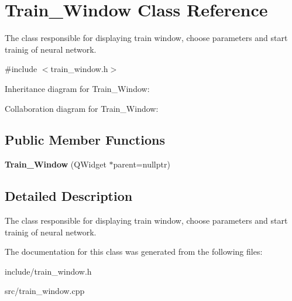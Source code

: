 \hypertarget{classTrain__Window}{}\section{Train\+\_\+\+Window Class Reference}
\label{classTrain__Window}


The class responsible for displaying train window, choose parameters and start trainig of neural network.  




{\ttfamily \#include $<$train\+\_\+window.\+h$>$}



Inheritance diagram for Train\+\_\+\+Window\+:


Collaboration diagram for Train\+\_\+\+Window\+:
\subsection*{Public Member Functions}
\begin{DoxyCompactItemize}
\item 
\mbox{\label{classTrain__Window_a2afb72b76fd8f3270b001b4054795ba9}} 
{\bfseries Train\+\_\+\+Window} (Q\+Widget $\ast$parent=nullptr)
\end{DoxyCompactItemize}


\subsection{Detailed Description}
The class responsible for displaying train window, choose parameters and start trainig of neural network. 



The documentation for this class was generated from the following files\+:\begin{DoxyCompactItemize}
\item 
include/train\+\_\+window.\+h\item 
src/train\+\_\+window.\+cpp\end{DoxyCompactItemize}
